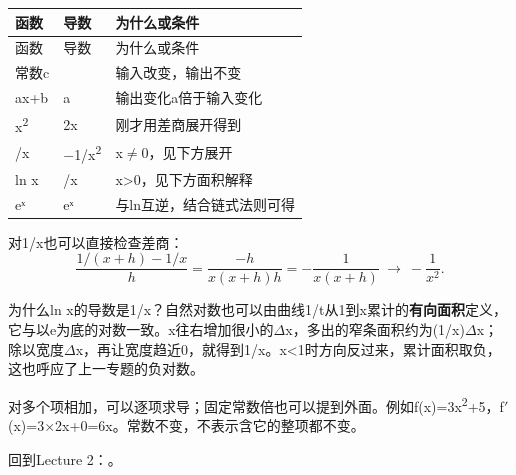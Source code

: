 \begingroup
\small\setlength{\tabcolsep}{3pt}
\renewcommand{\arraystretch}{1.22}
\begin{longtable}{@{}>{\raggedright\arraybackslash}p{}>{\raggedright\arraybackslash}p{}>{\raggedright\arraybackslash}p{}@{}}
\toprule
函数 & 导数 & 为什么或条件 \\
\midrule\endfirsthead
函数 & 导数 & 为什么或条件 \\
\midrule\endhead
\bottomrule\endfoot
常数c & 0 & 输入改变，输出不变 \\
ax+b & a & 输出变化a倍于输入变化 \\
x\textsuperscript{2} & 2x & 刚才用差商展开得到 \\
1/x & \ensuremath{-}1/x\textsuperscript{2} & x\ensuremath{\ne}0，见下方展开 \\
ln x & 1/x & x>0，见下方面积解释 \\
eˣ & eˣ & 与ln互逆，结合链式法则可得 \\
\end{longtable}
\endgroup


对1/x也可以直接检查差商：
\[
\frac{1/(x+h)-1/x}{h}
=\frac{-h}{x(x+h)h}
=-\frac1{x(x+h)}\ \longrightarrow\ -\frac1{x^2}.\tag{M.17}
\]


为什么ln x的导数是1/x？自然对数也可以由曲线1/t从1到x累计的\textbf{有向面积}定义，它与以e为底的对数一致。x往右增加很小的\ensuremath{\Delta}x，多出的窄条面积约为(1/x)\ensuremath{\Delta}x；除以宽度\ensuremath{\Delta}x，再让宽度趋近0，就得到1/x。x<1时方向反过来，累计面积取负，这也呼应了上一专题的负对数。






对多个项相加，可以逐项求导；固定常数倍也可以提到外面。例如f(x)=3x\textsuperscript{2}+5，f\ensuremath{\prime}(x)=3\ensuremath{\times}2x+0=6x。常数不变，不表示含它的整项都不变。


回到Lecture 2：。








